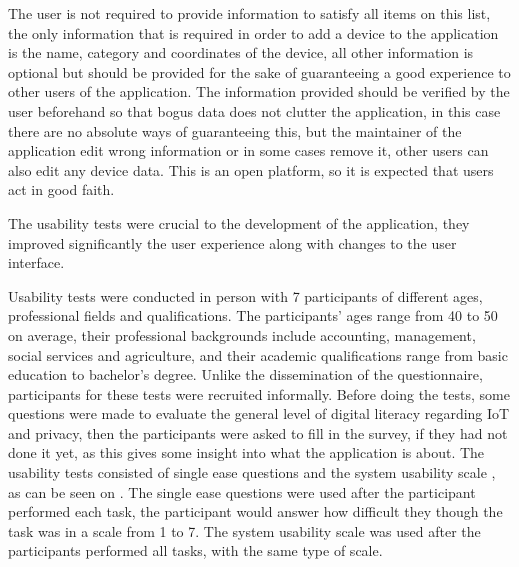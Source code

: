 The user is not required to provide information to satisfy all items on this list, the
only information that is required in order to add a device to the application is
the name, category and coordinates of the device, all other
information is optional but should be provided for the sake of guaranteeing a good
experience to other users of the application. The information provided
should be verified by the user beforehand so that bogus data does not clutter
the application, in this case there are no absolute ways of guaranteeing this,
but the maintainer of the application edit wrong information or in some
cases remove it, other users can also edit any device data. This is an
open platform, so it is expected that users act in good faith.

The usability tests were crucial to the development of the application,
they improved significantly the user experience along with changes to the
user interface.

Usability tests were conducted in person with 7 participants of different
ages, professional fields and qualifications. The participants' ages range
from 40 to 50 on average, their professional backgrounds include accounting,
management, social services and agriculture, and their academic qualifications range from
basic education to bachelor's degree. Unlike the dissemination of the questionnaire,
participants for these tests were recruited informally. Before doing the tests,
some questions were made to evaluate the general level of digital literacy
regarding IoT and privacy, then the participants were asked to fill in the
survey, if they had not done it yet, as this gives some insight into what the
application is about. The usability tests consisted of single ease
questions \cite{tedesco2006comparison}
and the system usability scale \cite{brooke1996sus}, as can be seen on .
The single ease questions were used after the participant performed each task, the
participant would answer how difficult they though the task was in a
scale from 1 to 7. The system usability scale was used after the participants
performed all tasks, with the same type of scale.
